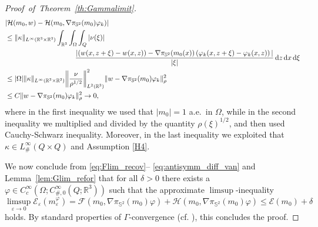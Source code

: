 \documentclass[reqno,11pt]{amsart}
\numberwithin{equation}{section}
\theoremstyle{thmlemcorr}
\numberwithin{theorem}{section}
\theoremstyle{thmlemcorr*}
\theoremstyle{defi}
\theoremstyle{remexample}
\theoremstyle{ass}
\newcommand{\R}{\mathbb{R}}
\renewcommand{\S}{\mathbb{S}}
\newcommand{\Ecal}{\mathcal{E}}
\renewcommand{\epsilon}{\varepsilon}
\newcommand{\dd}{\,\mathrm{d}}
\DeclarePairedDelimiter{\abs}{\lvert}{\rvert}
\DeclarePairedDelimiter{\norm}{\lVert}{\rVert}
\newcommand{\1}{\mathds{1}}
\newcommand{\Om}{\Omega}
\begin{document}
\begin{proof}[Proof~of~Theorem~\ref{th:Gammalimit}]
\begin{align}
     &|\mathcal{H}(m_0,w)-\mathcal{H}(m_0,\nabla \pi_{\S^2}(m_0)\varphi_k)|\nonumber \\ 
     & \leq \norm{\kappa}_{L^{\infty}(\R^3 \times \R^3)}\int_{\R^3}\int_\Om\int_Q  |\nu(\xi)|\nonumber  \\
     &\qquad\qquad\qquad\qquad\qquad\frac{|(w(x,z+\xi)-w(x,z))-\nabla \pi_{\S^2}(m_0(x))\left(\varphi_k(x,z+\xi)-\varphi_k(x,z)\right)|}{|\xi|} \dd z \dd x\dd \xi \nonumber \\ 
     & \leq \abs{\Omega} \norm{\kappa}_{L^{\infty}(\R^3 \times \R^3)} \norm*{\frac{\nu}{\rho^{1/2}}}_{L^{2}(\R^3)}^2 \norm{w-\nabla \pi_{\S^2}(m_0)\varphi_k}_\rho^2 \label{eq:antisymm_diff_van} \\ 
     & \leq C \norm{w-\nabla \pi_{\S^2}(m_0)\varphi_k}_\rho^2 \to 0,\nonumber
 \end{align}
 where in the first inequality we used that $|m_0| = 1$ a.e.\ in $\Om$, while in the second inequality we multiplied and divided by the quantity $\rho(\xi)^{1/2}$, and then used Cauchy-Schwarz inequality. Moreover, in the last inequality we exploited that $\kappa \in L^{\infty}_{\#}(Q\times Q) $ and Assumption \ref{H4}.
 
 We now conclude from \eqref{eq:Flim_recov}--%
 \eqref{eq:antisymm_diff_van} and Lemma~\ref{lem:Glim_refor} that for all \(\delta>0\) there exists a \(\varphi\in C_c^\infty(\Om; C^\infty_{\#,0}(Q;\R^3))\) such that the approximate \(\limsup\)-inequality
 \begin{equation*}
     \limsup_{\epsilon \to 0} \Ecal_\epsilon(m_\epsilon^\varphi) 
    = \mathcal{F}(m_0,\nabla \pi_{\S^2}(m_0)\varphi) + \mathcal{H}(m_0,\nabla \pi_{\S^2}(m_0)\varphi)
    \le\Ecal(m_0)+\delta
 \end{equation*}
 holds.
 By standard properties of \(\Gamma\)-convergence (cf. \cite[Section~1.2]{Br02}), this concludes the proof.
 \end{proof}
\end{document}
